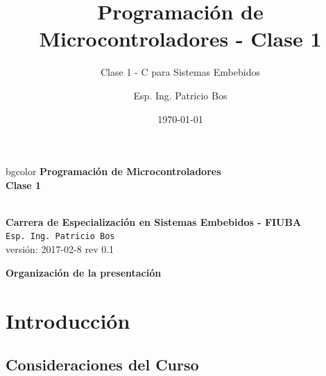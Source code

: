 \documentclass[aspectratio=169]{beamer}
\title[Clase 1]{Programación de Microcontroladores - Clase 1}
\subtitle{Clase 1 - C para Sistemas Embebidos}
\author[]{Esp. Ing. Patricio Bos}
\institute[CESE-FIUBA]{Carrera de Especialización en Sistemas Embebidos - FIUBA}
\date{\today}
\begin{document}



\begingroup
\makeatletter
\setlength{\hoffset}{-.5\beamer@sidebarwidth}
\makeatother
\begin{frame}
\begin{center}
\hfill
    \begin{beamercolorbox}[center,dp=3ex,ht=10.25ex, wd=1\linewidth]{bgcolor}
        \Large\textbf{Programación de Microcontroladores}\\
        \vspace{5px}
        \Large\textbf{Clase 1}
    \end{beamercolorbox}
\hfill\hfill
\\
\vspace{5px}
\textbf{Carrera de Especialización en Sistemas Embebidos - FIUBA}\\
\vspace{10px}
\texttt{Esp. Ing. Patricio Bos}\\

\vfill
\tiny versión: 2017-02-8 rev 0.1 

\end{center}
\end{frame}
\endgroup


\begin{frame}{\textbf{Organización de la presentación}}
  \tableofcontents
\end{frame}
%
%

\section{Introducción}


\subsection{Consideraciones del Curso}
\end{document}
